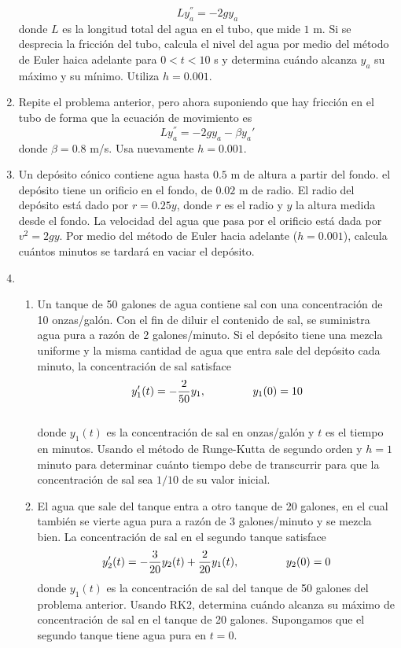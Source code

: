\documentclass[letterpaper]{article}
\begin{document}
\begin{enumerate}
\[ Ly_{a}^{''} = -2 gy_{a} \]
donde $L$ es la longitud total del agua en el tubo, que mide $1$ m. Si se desprecia la fricción del tubo, calcula el nivel del agua por medio del método de Euler haica adelante para $0 < t < 10$ s y determina cuándo alcanza $y_{a}$ su máximo y su mínimo. Utiliza $h=0.001$.
\item Repite el problema anterior, pero ahora suponiendo que hay fricción en el tubo de forma que la ecuación de movimiento es 
\[ Ly_{a}^{''} = -2 gy_{a} - \beta y_{a}{'}\]
donde $\beta=0.8$ m/s. Usa nuevamente $h=0.001$.
\item Un depósito cónico contiene agua hasta $0.5$ m de altura a partir del fondo. el depósito tiene un orificio en el fondo, de $0.02$ m de radio. El radio del depósito está dado por $r=0.25y$, donde $r$ es el radio y $y$ la altura medida desde el fondo. La velocidad del agua que pasa por el orificio está dada por $v^{2}=2gy$. Por medio del método de Euler hacia adelante ($h=0.001$), calcula cuántos minutos se tardará en vaciar el depósito.
\item \begin{enumerate}
\item Un tanque de 50 galones de agua contiene sal con una concentración de 10 onzas/galón. Con el fin de diluir el contenido de sal, se suministra agua pura a razón de 2 galones/minuto. Si el depósito tiene una mezcla uniforme y la misma cantidad de agua que entra sale del depósito cada minuto, la concentración de sal satisface\\
\[ y'_{1}(t)= -\frac{2}{50}y_{1}, \hspace{1.5cm} y_{1}(0)=10 \]\\
donde $y_{1}(t)$ es la concentración de sal en onzas/galón y $t$ es el tiempo en minutos. Usando el método de Runge-Kutta de segundo orden y $h=1$ minuto para determinar cuánto tiempo debe de transcurrir para que la concentración de sal sea $1/10$ de su valor inicial.
\item El agua que sale del tanque entra a otro tanque de 20 galones, en el cual también se vierte agua pura a razón de 3 galones/minuto y se mezcla bien. La concentración de sal en el segundo tanque satisface
\[ y'_{2}(t)= -\frac{3}{20}y_{2}(t)+\dfrac{2}{20}y_{1}(t), \hspace{1.5cm} y_{2}(0)=0 \]
donde $y_{1}(t)$ es la concentración de sal del tanque de 50 galones del problema anterior. Usando RK2, determina cuándo alcanza su máximo de concentración de sal en el tanque de 20 galones. Supongamos que el segundo tanque tiene agua pura en $t=0$.

\end{enumerate}
\end{enumerate}
\end{document}
